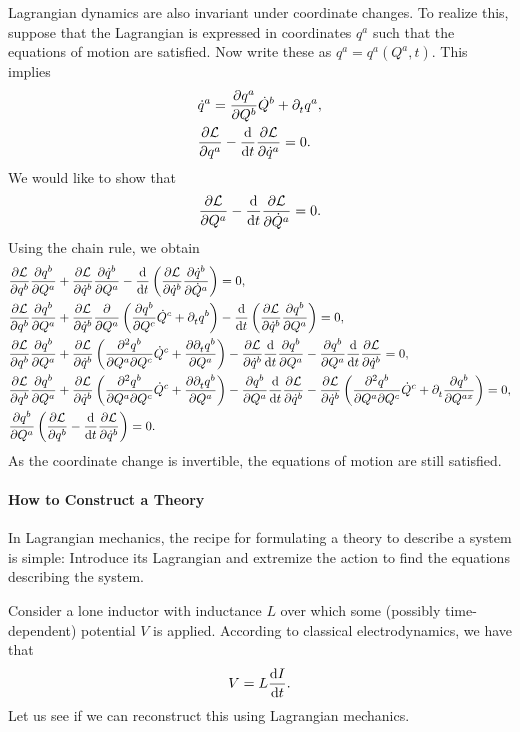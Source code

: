 Lagrangian dynamics are also invariant under coordinate changes. To realize this, suppose that the Lagrangian is expressed in coordinates $q^{a}$ such that the equations of motion are satisfied. Now write these as $q^{a} = q^{a}(Q^{a}, t)$. This implies
\begin{align*}
	&\dot{q}^{a} = \pdv{q^{a}}{Q^{b}}\dot{Q}^{b} + \partial^{}_{t}q^{a}, \\
	&\pdv{\ensuremath{\mathcal{L}}}{q^{a}} - \dv{t}\pdv{\ensuremath{\mathcal{L}}}{\dot{q}^{a}} = 0.
\end{align*}
We would like to show that
\begin{align*}
	\pdv{\ensuremath{\mathcal{L}}}{Q^{a}} - \dv{t}\pdv{\ensuremath{\mathcal{L}}}{\dot{Q}^{a}} = 0.
\end{align*}
Using the chain rule, we obtain
\begin{align*}
	&\pdv{\ensuremath{\mathcal{L}}}{q^{b}}\pdv{q^{b}}{Q^{a}} + \pdv{\ensuremath{\mathcal{L}}}{\dot{q}^{b}}\pdv{\dot{q}^{b}}{Q^{a}} - \dv{t}\left(\pdv{\ensuremath{\mathcal{L}}}{\dot{q}^{b}}\pdv{\dot{q}^{b}}{\dot{Q}^{a}}\right) = 0, \\
	&\pdv{\ensuremath{\mathcal{L}}}{q^{b}}\pdv{q^{b}}{Q^{a}} + \pdv{\ensuremath{\mathcal{L}}}{\dot{q}^{b}}\pdv{Q^{a}}\left(\pdv{q^{b}}{Q^{c}}\dot{Q}^{c} + \partial^{}_{t}q^{b}\right) - \dv{t}\left(\pdv{\ensuremath{\mathcal{L}}}{\dot{q}^{b}}\pdv{q^{b}}{Q^{a}}\right) = 0, \\
	&\pdv{\ensuremath{\mathcal{L}}}{q^{b}}\pdv{q^{b}}{Q^{a}} + \pdv{\ensuremath{\mathcal{L}}}{\dot{q}^{b}}\left(\pdv{q^{b}}{Q^{a}}{Q^{c}}\dot{Q}^{c} + \pdv{\partial^{}_{t}q^{b}}{Q^{a}}\right) - \pdv{\ensuremath{\mathcal{L}}}{\dot{q}^{b}}\dv{t}\pdv{q^{b}}{Q^{a}} - \pdv{q^{b}}{Q^{a}}\dv{t}\pdv{\ensuremath{\mathcal{L}}}{\dot{q}^{b}} = 0, \\
	&\pdv{\ensuremath{\mathcal{L}}}{q^{b}}\pdv{q^{b}}{Q^{a}} + \pdv{\ensuremath{\mathcal{L}}}{\dot{q}^{b}}\left(\pdv{q^{b}}{Q^{a}}{Q^{c}}\dot{Q}^{c} + \pdv{\partial^{}_{t}q^{b}}{Q^{a}}\right) - \pdv{q^{b}}{Q^{a}}\dv{t}\pdv{\ensuremath{\mathcal{L}}}{\dot{q}^{b}} - \pdv{\ensuremath{\mathcal{L}}}{\dot{q}^{b}}\left(\pdv{q^{b}}{Q^{a}}{Q^{c}}\dot{Q}^{c} + \partial^{}_{t}\pdv{q^{b}}{Q^{ax}}\right) = 0, \\
	&\pdv{q^{b}}{Q^{a}}\left(\pdv{\ensuremath{\mathcal{L}}}{q^{b}} - \dv{t}\pdv{\ensuremath{\mathcal{L}}}{\dot{q}^{b}}\right) = 0.
\end{align*}
As the coordinate change is invertible, the equations of motion are still satisfied.

\paragraph{How to Construct a Theory}
In Lagrangian mechanics, the recipe for formulating a theory to describe a system is simple: Introduce its Lagrangian and extremize the action to find the equations describing the system.

Consider a lone inductor with inductance $L$ over which some (possibly time-dependent) potential $V$ is applied. According to classical electrodynamics, we have that
\begin{align*}
V = L\dv{I}{t}.
\end{align*}
Let us see if we can reconstruct this using Lagrangian mechanics.

